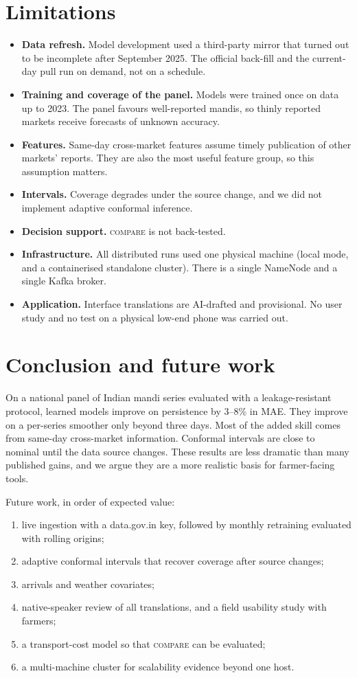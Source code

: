 \section{Limitations}\label{sec:limitations}
\begin{itemize}
  \item \textbf{Data refresh.} Model development used a third-party mirror that turned out to be incomplete after September 2025. The official back-fill and the current-day pull run on demand, not on a schedule.
  \item \textbf{Training and coverage of the panel.} Models were trained once on data up to 2023. The panel favours well-reported mandis, so thinly reported markets receive forecasts of unknown accuracy.
  \item \textbf{Features.} Same-day cross-market features assume timely publication of other markets' reports. They are also the most useful feature group, so this assumption matters.
  \item \textbf{Intervals.} Coverage degrades under the source change, and we did not implement adaptive conformal inference.
  \item \textbf{Decision support.} \textsc{compare} is not back-tested.
  \item \textbf{Infrastructure.} All distributed runs used one physical machine (local mode, and a containerised standalone cluster). There is a single NameNode and a single Kafka broker.
  \item \textbf{Application.} Interface translations are AI-drafted and provisional. No user study and no test on a physical low-end phone was carried out.
\end{itemize}

\section{Conclusion and future work}\label{sec:conclusion}
On a national panel of Indian mandi series evaluated with a leakage-resistant protocol, learned models improve on persistence by 3--8\% in MAE.
They improve on a per-series smoother only beyond three days.
Most of the added skill comes from same-day cross-market information.
Conformal intervals are close to nominal until the data source changes.
These results are less dramatic than many published gains, and we argue they are a more realistic basis for farmer-facing tools.

Future work, in order of expected value:
\begin{enumerate}
  \item live ingestion with a data.gov.in key, followed by monthly retraining evaluated with rolling origins;
  \item adaptive conformal intervals that recover coverage after source changes;
  \item arrivals and weather covariates;
  \item native-speaker review of all translations, and a field usability study with farmers;
  \item a transport-cost model so that \textsc{compare} can be evaluated;
  \item a multi-machine cluster for scalability evidence beyond one host.
\end{enumerate}
